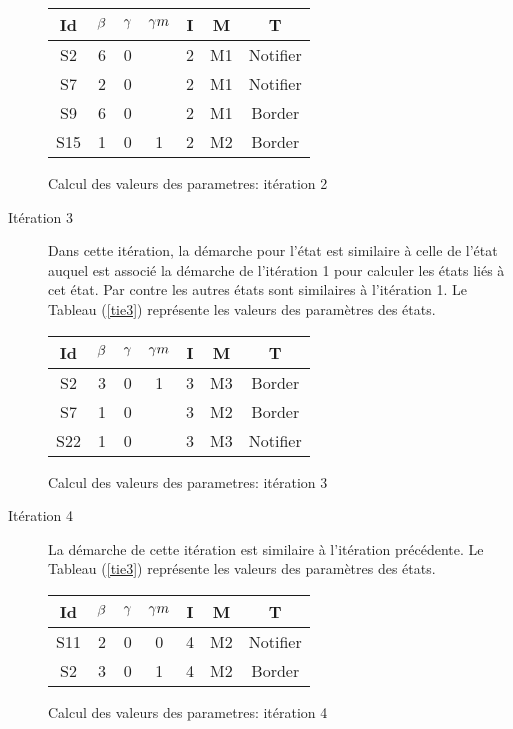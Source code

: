 \begin{Exemple}
\begin{description}
\begin{tableth}
\begin{tabular}{|*{7}{c|}}
		\hline
		Id&$\beta{}$&	$\gamma{}$	&$\gamma m{}$ &	I&	M&	T\\ \hline
		S2&		6&	0&	&	2&	M1&	Notifier\\ \hline
		S7&		2&	0&	&	2&	M1&	Notifier\\ \hline
		S9&		6&	0&	&	2&	M1&	Border\\ \hline
		S15&	1&	0&	1&	2&	M2&	Border\\ \hline		
	\end{tabular}
	\caption{Calcul des valeurs des parametres: itération 2}\label{tie2}
\end{tableth}
\item[Itération 3] Dans cette itération, la démarche pour l'état  est similaire à celle de l'état  auquel est associé la démarche de l'itération 1 pour calculer les états liés à cet état. Par contre les autres états sont similaires à l'itération 1. Le Tableau (\ref{tie3}) représente les valeurs des paramètres  des états. 
\begin{tableth}
	\centering
	\begin{tabular}{|*{7}{c|}}
		\hline
		Id&$\beta{}$&	$\gamma{}$	&$\gamma m{}$ &	I&	M&	T\\ \hline
		S2&		3&	0&	1&	3&	M3&	Border\\ \hline
		S7&		1&	0&	&	3&	M2&	Border\\ \hline
		S22&	1&	0&	&	3&	M3&	Notifier\\ \hline	
	\end{tabular}
	\caption{Calcul des valeurs des parametres: itération 3}\label{tie3}
\end{tableth}

\item[Itération 4] La démarche de cette itération est similaire à l'itération précédente. Le Tableau (\ref{tie3}) représente les valeurs des paramètres  des états.  
\begin{tableth}
	\centering
	\begin{tabular}{|*{7}{c|}}
		\hline
		Id&$\beta{}$&	$\gamma{}$	&$\gamma m{}$ &	I&	M&	T\\ \hline
		S11&	2&	0&	0&	4&	M2&	Notifier\\ \hline
		S2&		3&	0&	1&	4&	M2&	Border\\ \hline
	\end{tabular}
	\caption{Calcul des valeurs des parametres: itération 4}\label{tie4}
\end{tableth}


\end{description}
\end{Exemple}

